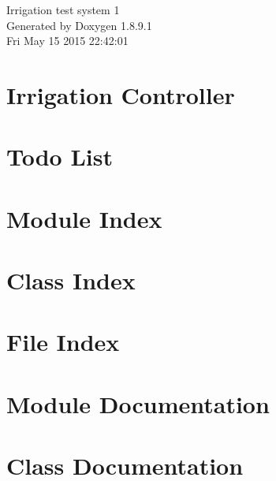 \documentclass[twoside]{book}
\newcommand{\+}{\discretionary{\mbox{\scriptsize$\hookleftarrow$}}{}{}}
\newcommand{\clearemptydoublepage}{%
  \newpage{\pagestyle{empty}\cleardoublepage}%
}
\begin{document}
\hypersetup{pageanchor=false,
             bookmarks=true,
             bookmarksnumbered=true,
             pdfencoding=unicode
            }
\begin{titlepage}
\vspace*{7cm}
\begin{center}%
{\Large Irrigation test system 1 }\\
\vspace*{1cm}
{\large Generated by Doxygen 1.8.9.1}\\
\vspace*{0.5cm}
{\small Fri May 15 2015 22:42:01}\\
\end{center}
\end{titlepage}
\clearemptydoublepage
\tableofcontents
\clearemptydoublepage
{}
\hypersetup{pageanchor=true}

\chapter{Irrigation Controller}
\label{index}\hypertarget{index}{}
\chapter{Todo List}
\label{todo}
\hypertarget{todo}{}

\chapter{Module Index}

\chapter{Class Index}

\chapter{File Index}

\chapter{Module Documentation}




\chapter{Class Documentation}



























\end{document}
